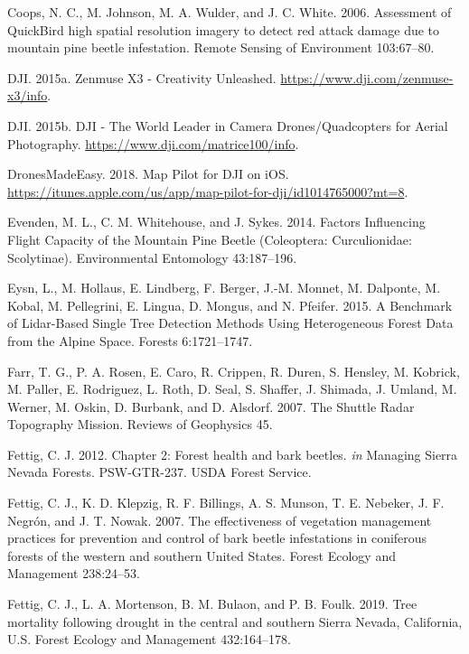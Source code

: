 \documentclass[]{article}
\begin{document}
\hypertarget{ref-coops2006}{}
Coops, N. C., M. Johnson, M. A. Wulder, and J. C. White. 2006.
Assessment of QuickBird high spatial resolution imagery to detect red
attack damage due to mountain pine beetle infestation. Remote Sensing of
Environment 103:67--80.

\hypertarget{ref-dji2015}{}
DJI. 2015a. Zenmuse X3 - Creativity Unleashed.
\url{https://www.dji.com/zenmuse-x3/info}.

\hypertarget{ref-dji2015a}{}
DJI. 2015b. DJI - The World Leader in Camera Drones/Quadcopters for
Aerial Photography. \url{https://www.dji.com/matrice100/info}.

\hypertarget{ref-dronesmadeeasy2018}{}
DronesMadeEasy. 2018. ‎Map Pilot for DJI on iOS.
\url{https://itunes.apple.com/us/app/map-pilot-for-dji/id1014765000?mt=8}.

\hypertarget{ref-evenden2014}{}
Evenden, M. L., C. M. Whitehouse, and J. Sykes. 2014. Factors
Influencing Flight Capacity of the Mountain Pine Beetle (Coleoptera:
Curculionidae: Scolytinae). Environmental Entomology 43:187--196.

\hypertarget{ref-eysn2015}{}
Eysn, L., M. Hollaus, E. Lindberg, F. Berger, J.-M. Monnet, M. Dalponte,
M. Kobal, M. Pellegrini, E. Lingua, D. Mongus, and N. Pfeifer. 2015. A
Benchmark of Lidar-Based Single Tree Detection Methods Using
Heterogeneous Forest Data from the Alpine Space. Forests 6:1721--1747.

\hypertarget{ref-farr2007}{}
Farr, T. G., P. A. Rosen, E. Caro, R. Crippen, R. Duren, S. Hensley, M.
Kobrick, M. Paller, E. Rodriguez, L. Roth, D. Seal, S. Shaffer, J.
Shimada, J. Umland, M. Werner, M. Oskin, D. Burbank, and D. Alsdorf.
2007. The Shuttle Radar Topography Mission. Reviews of Geophysics 45.

\hypertarget{ref-fettig2012b}{}
Fettig, C. J. 2012. Chapter 2: Forest health and bark beetles. \emph{in}
Managing Sierra Nevada Forests. PSW-GTR-237. USDA Forest Service.

\hypertarget{ref-fettig2007}{}
Fettig, C. J., K. D. Klepzig, R. F. Billings, A. S. Munson, T. E.
Nebeker, J. F. Negrón, and J. T. Nowak. 2007. The effectiveness of
vegetation management practices for prevention and control of bark
beetle infestations in coniferous forests of the western and southern
United States. Forest Ecology and Management 238:24--53.

\hypertarget{ref-fettig2019}{}
Fettig, C. J., L. A. Mortenson, B. M. Bulaon, and P. B. Foulk. 2019.
Tree mortality following drought in the central and southern Sierra
Nevada, California, U.S. Forest Ecology and Management 432:164--178.
\end{document}
